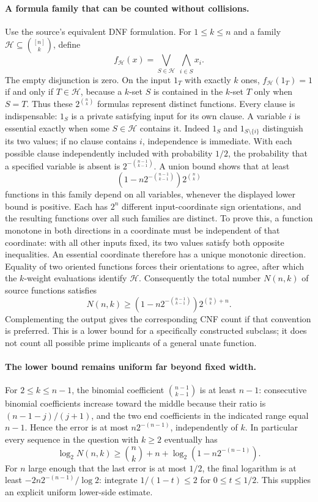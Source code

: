 \documentclass[11pt]{article}
\begin{document}
\paragraph{A formula family that can be counted without collisions.}
Use the source's equivalent DNF formulation. For $1\leq k\leq n$ and a family
$\mathcal H\subseteq\binom{[n]}k$, define
\[
 f_{\mathcal H}(x)=\bigvee_{S\in\mathcal H}\ \bigwedge_{i\in S}x_i.
\]
The empty disjunction is zero. On the input $1_T$ with exactly $k$ ones,
$f_{\mathcal H}(1_T)=1$ if and only if $T\in\mathcal H$, because a $k$-set
$S$ is contained in the $k$-set $T$ only when $S=T$.
Thus these $2^{\binom nk}$ formulas represent distinct functions. Every clause
is indispensable: $1_S$ is a private satisfying input for its own clause.
A variable $i$ is essential exactly when some $S\in\mathcal H$ contains it.
Indeed $1_S$ and $1_{S\setminus\{i\}}$ distinguish its two values; if no clause
contains $i$, independence is immediate.
With each possible clause independently included with probability $1/2$, the
probability that a specified variable is absent is
$2^{-\binom{n-1}{k-1}}$. A union bound shows that at least
\[
 \left(1-n2^{-\binom{n-1}{k-1}}\right)2^{\binom nk}
\]
functions in this family depend on all variables, whenever the displayed lower
bound is positive. Each has $2^n$ different input-coordinate sign orientations,
and the resulting functions over all such families are distinct. To prove this,
a function monotone in both directions in a coordinate must be independent of
that coordinate: with all other inputs fixed, its two values satisfy both
opposite inequalities. An essential coordinate therefore has a unique monotonic
direction. Equality of two oriented functions forces their orientations to agree,
after which the $k$-weight evaluations identify $\mathcal H$.
Consequently the total number $N(n,k)$ of source functions satisfies
\[
 N(n,k)\geq
 \left(1-n2^{-\binom{n-1}{k-1}}\right)2^{\binom nk+n}.
\]
Complementing the output gives the corresponding CNF count if that convention
is preferred. This is a lower bound for a specifically constructed subclass;
it does not count all possible prime implicants of a general unate function.

\paragraph{The lower bound remains uniform far beyond fixed width.}
For $2\leq k\leq n-1$, the binomial coefficient
$\binom{n-1}{k-1}$ is at least $n-1$: consecutive binomial coefficients increase
toward the middle because their ratio is $(n-1-j)/(j+1)$, and the two end
coefficients in the indicated range equal $n-1$. Hence the error is at most
$n2^{-(n-1)}$, independently of $k$.
In particular every sequence in the question with $k\geq2$ eventually has
\[
 \log_2 N(n,k)\geq \binom nk+n+\log_2(1-n2^{-(n-1)}).
\]
For $n$ large enough that the last error is at most $1/2$, the final logarithm
is at least $-2n2^{-(n-1)}/\log 2$: integrate $1/(1-t)\leq2$ for
$0\leq t\leq1/2$. This supplies an explicit uniform lower-side estimate.
\end{document}
